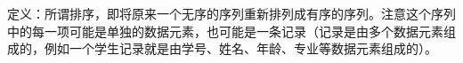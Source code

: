 {定义：所谓排序，即{将原来一个无序的序列重新排列成有序的序列}。注意这个序列中的每一项可能是单独的数据元素，也可能是一条记录（记录是由多个数据元素组成的，例如一个学生记录就是由学号、姓名、年龄、专业等数据元素组成的）。}
